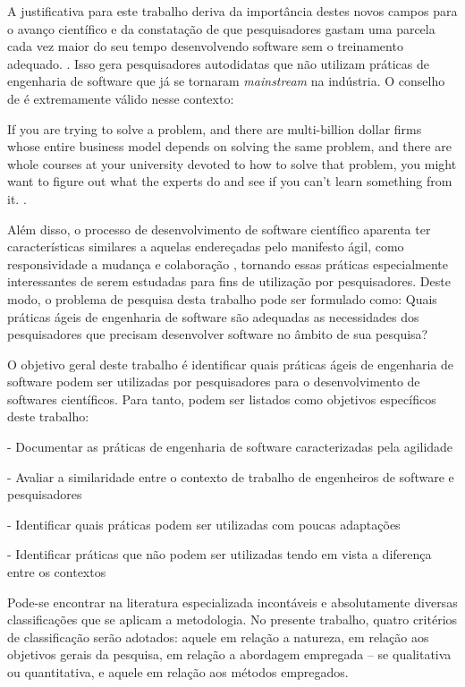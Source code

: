 \documentclass[
	article,			%
	11pt,				%
	oneside,			%
	a4paper,			%
	english,			%
	brazil,				%
	sumario=tradicional
	]{abntex2}
\begin{document}
A justificativa para este trabalho deriva da importância destes novos campos para o avanço científico e da constatação de que pesquisadores gastam uma parcela cada vez maior do seu tempo desenvolvendo software sem o treinamento adequado. \cite{wilson2014}. Isso gera pesquisadores autodidatas que não utilizam práticas de engenharia de software que já se tornaram \emph{mainstream} na indústria. O conselho de  é extremamente válido nesse contexto:  

\begin{citacao}
If you are trying to solve a problem, and there are multi-billion dollar firms whose entire business model depends on solving the same problem, and there are whole courses at your university devoted to how to solve that problem, you might want to figure out what the experts do and see if you can’t learn something from it. \cite[pg. 5]{gentzkow2014}.
\end{citacao}

Além disso, o processo de desenvolvimento de software científico aparenta ter características similares a aquelas endereçadas pelo manifesto ágil, como responsividade a mudança e colaboração \cite{sletholt2012}, tornando essas práticas especialmente interessantes de serem estudadas para fins de utilização por pesquisadores. Deste modo, o problema de pesquisa desta trabalho pode ser formulado como: Quais práticas ágeis de engenharia de software são adequadas as necessidades dos pesquisadores que precisam desenvolver software no âmbito de sua pesquisa?

O objetivo geral deste trabalho é identificar quais práticas ágeis de engenharia de software podem ser utilizadas por pesquisadores para o desenvolvimento de softwares científicos. Para tanto, podem ser listados como objetivos específicos deste trabalho:

- Documentar as práticas de engenharia de software caracterizadas pela agilidade

- Avaliar a similaridade entre o contexto de trabalho de engenheiros de software e pesquisadores

- Identificar quais práticas podem ser utilizadas com poucas adaptações

- Identificar práticas que não podem ser utilizadas tendo em vista a diferença entre os contextos

Pode-se encontrar na literatura especializada incontáveis e absolutamente diversas classificações que se aplicam a metodologia. No presente trabalho, quatro critérios de classificação serão adotados: aquele em relação a natureza, em relação aos objetivos gerais da pesquisa, em relação a abordagem empregada – se qualitativa ou quantitativa, e aquele em relação aos métodos empregados.
\end{document}
